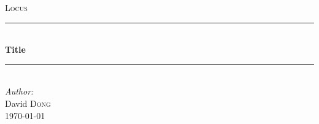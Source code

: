 \begin{titlepage}

\newcommand{\HRule}{\rule{\linewidth}{0.5mm}} %

\center %
 

\textsc{\LARGE Locus}\\[1.5cm] %


\HRule \\[0.4cm]
{ \huge \bfseries Title}\\[0.4cm] %
\HRule \\[1.5cm]
 

\Large \emph{Author:}\\
David \textsc{Dong}\\[3cm] %


{\large \today}\\[3cm] %


 

\vfill %

\end{titlepage}

